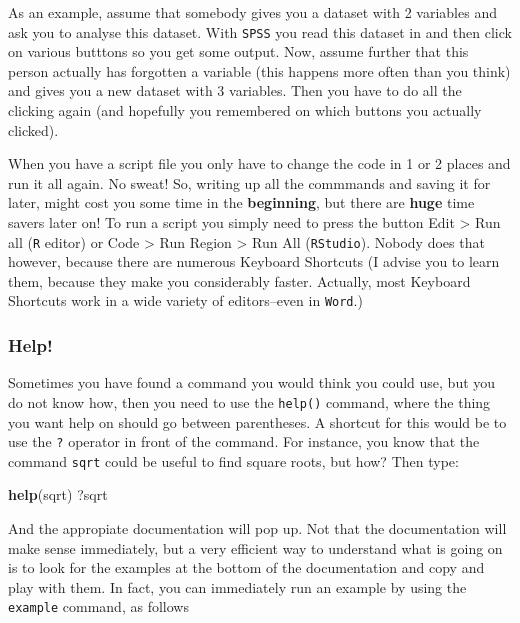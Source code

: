 \documentclass[]{article}
\newenvironment{Shaded}{\begin{snugshade}}{\end{snugshade}}
\newcommand{\KeywordTok}[1]{\textcolor[rgb]{0.13,0.29,0.53}{\textbf{#1}}}
\newcommand{\NormalTok}[1]{#1}
\theoremstyle{definition}
\theoremstyle{definition}
\theoremstyle{definition}
\theoremstyle{remark}
\begin{document}
As an example, assume that somebody gives you a dataset with 2 variables
and ask you to analyse this dataset. With \texttt{SPSS} you read this
dataset in and then click on various butttons so you get some output.
Now, assume further that this person actually has forgotten a variable
(this happens more often than you think) and gives you a new dataset
with 3 variables. Then you have to do all the clicking again (and
hopefully you remembered on which buttons you actually clicked).

When you have a script file you only have to change the code in 1 or 2
places and run it all again. No sweat! So, writing up all the commmands
and saving it for later, might cost you some time in the
\textbf{beginning}, but there are \textbf{huge} time savers later on! To
run a script you simply need to press the button Edit \textgreater{} Run
all (\texttt{R} editor) or Code \textgreater{} Run Region \textgreater{}
Run All (\texttt{RStudio}). Nobody does that however, because there are
numerous Keyboard Shortcuts (I advise you to learn them, because they
make you considerably faster. Actually, most Keyboard Shortcuts work in
a wide variety of editors--even in \texttt{Word}.)

\subsubsection{Help!}\label{help}

Sometimes you have found a command you would think you could use, but
you do not know how, then you need to use the \texttt{help()} command,
where the thing you want help on should go between parentheses. A
shortcut for this would be to use the \texttt{?} operator in front of
the command. For instance, you know that the command \texttt{sqrt} could
be useful to find square roots, but how? Then type:

\begin{Shaded}
\begin{Highlighting}[]
\KeywordTok{help}\NormalTok{(sqrt)}
\NormalTok{?sqrt}
\end{Highlighting}
\end{Shaded}

And the appropiate documentation will pop up. Not that the documentation
will make sense immediately, but a very efficient way to understand what
is going on is to look for the examples at the bottom of the
documentation and copy and play with them. In fact, you can immediately
run an example by using the \texttt{example} command, as follows
\end{document}
